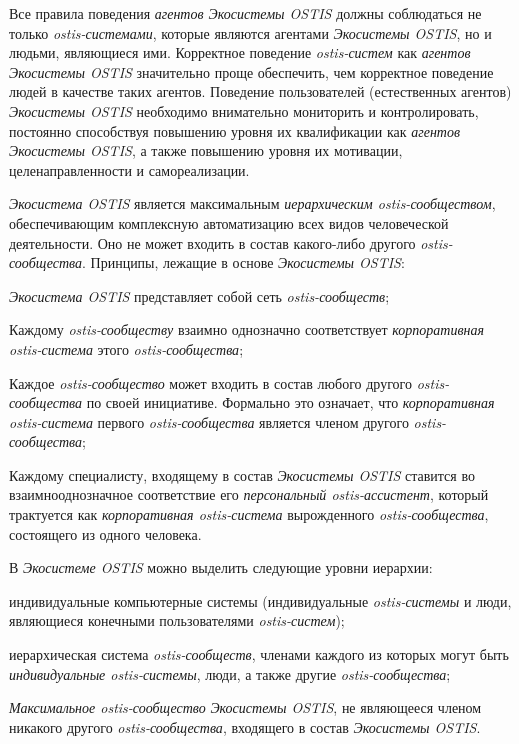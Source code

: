 Все правила поведения \textit{агентов Экосистемы OSTIS} должны соблюдаться не только \textit{ostis-системами}, которые являются агентами \textit{Экосистемы OSTIS}, но и людьми, являющиеся ими. 
Корректное поведение \textit{ostis-систем} как \textit{агентов Экосистемы OSTIS} значительно проще обеспечить, чем корректное поведение людей в качестве таких агентов. 
Поведение пользователей (естественных агентов) \textit{Экосистемы OSTIS} необходимо внимательно мониторить и контролировать, постоянно способствуя повышению уровня их квалификации как \textit{агентов Экосистемы OSTIS}, а также повышению уровня их мотивации, целенаправленности и самореализации.

\textit{Экосистема OSTIS} является максимальным \textit{иерархическим ostis-сообществом}, обеспечивающим комплексную автоматизацию всех видов человеческой деятельности. 
Оно не может входить в состав какого-либо другого \textit{ostis-сообщества}. 
Принципы, лежащие в основе \textit{Экосистемы OSTIS}:
\begin{textitemize}
    \item \textit{Экосистема OSTIS} представляет собой сеть \textit{ostis-сообществ};
    \item Каждому \textit{ostis-сообществу} взаимно однозначно соответствует \textit{корпоративная ostis-система} этого \textit{ostis-сообщества};
    \item Каждое \textit{ostis-сообщество} может входить в состав любого другого \textit{ostis-сообщества} по своей инициативе. Формально это означает, что \textit{корпоративная ostis-система} первого \textit{ostis-сообщества} является членом другого \textit{ostis-сообщества};
    \item Каждому специалисту, входящему в состав \textit{Экосистемы OSTIS} ставится во взаимнооднозначное соответствие его \textit{персональный ostis-ассистент}, который трактуется как \textit{корпоративная ostis-система} вырожденного \textit{ostis-сообщества}, состоящего из одного человека.
\end{textitemize}

В \textit{Экосистеме OSTIS} можно выделить следующие уровни иерархии:
\begin{textitemize}
    \item индивидуальные компьютерные системы (индивидуальные \textit{ostis-системы} и люди, являющиеся конечными пользователями \textit{ostis-систем});
    \item иерархическая система \textit{ostis-сообществ}, членами каждого из которых могут быть \textit{индивидуальные ostis-системы}, люди, а также другие \textit{ostis-сообщества};
    \item \textit{Максимальное ostis-сообщество} \textit{Экосистемы OSTIS}, не являющееся членом никакого другого \textit{ostis-сообщества}, входящего в состав \textit{Экосистемы OSTIS}.
\end{textitemize}

